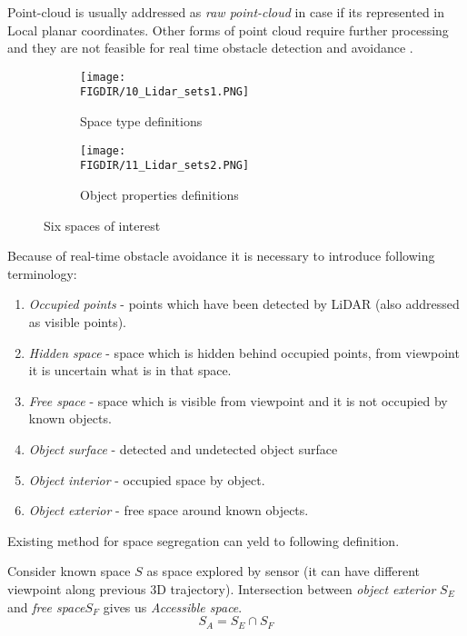 Point-cloud is usually addressed as \textit{raw point-cloud} in case if its represented in Local planar coordinates. Other forms of point cloud require further processing and they are not feasible for real time obstacle detection and avoidance \cite{chen2007airborne}.

\begin{figure}[H]
    \begin{subfigure}{0.5\textwidth}
    \texttt{[image: \\FIGDIR/10\_Lidar\_sets1.PNG]} 
    \caption{Space type definitions}
    \label{fig:Spacetypes}
    \end{subfigure}
    \begin{subfigure}{0.5\textwidth}
    \texttt{[image: \\FIGDIR/11\_Lidar\_sets2.PNG]}
    \caption{Object properties definitions}
    \label{fig:ObectProperties}
    \end{subfigure}
    \caption{Six spaces of interest \cite{yapo2008probabilistic}}
    \label{fig:Spaces of interests}
 \end{figure}
 
\noindent  Because of real-time obstacle avoidance it is necessary to introduce following terminology:
\begin{enumerate}
    \item \textit{Occupied points} - points which have been detected by LiDAR (also addressed as visible points).
    \item \textit{Hidden space} - space which is hidden behind occupied points, from viewpoint it is uncertain what is in that space. 
    \item \textit{Free space} - space which is visible from viewpoint and it is not occupied by known objects.
    \item \textit{Object surface} - detected and undetected object surface
    \item \textit{Object interior} - occupied space by object.
    \item \textit{Object exterior} - free space around known objects.
\end{enumerate}
Existing method for space segregation \cite{yapo2008probabilistic} can yeld to following definition.
\begin{definition}\label{def:accessibleSpace}
    Consider known space $S$ as space explored by sensor (it can have different viewpoint along previous 3D trajectory).
    Intersection between \textit{object exterior} $S_E$ and \textit{free space}$S_F$ gives us \textit{Accessible space}.
    \begin{equation}
        S_A = S_E \cap S_F
    \end{equation}
\end{definition}
 
